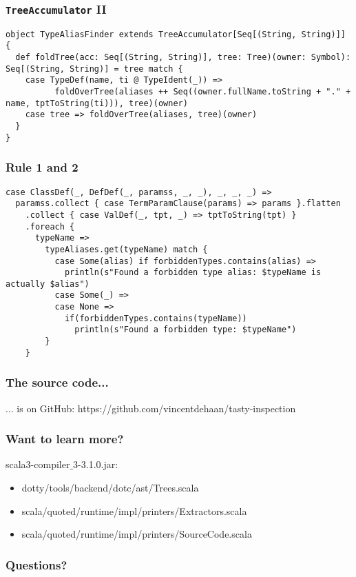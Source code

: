 \documentclass[aspectratio=169]{beamer}
\begin{document}
\begin{frame}[fragile]
\frametitle{\texttt{TreeAccumulator} II}
\begin{lstlisting}[style=myScalastyle,frame=none]
object TypeAliasFinder extends TreeAccumulator[Seq[(String, String)]] {
  def foldTree(acc: Seq[(String, String)], tree: Tree)(owner: Symbol): Seq[(String, String)] = tree match {
    case TypeDef(name, ti @ TypeIdent(_)) =>
          foldOverTree(aliases ++ Seq((owner.fullName.toString + "." + name, tptToString(ti))), tree)(owner)
    case tree => foldOverTree(aliases, tree)(owner)
  }
}
\end{lstlisting}

\end{frame}

\begin{frame}[fragile]
\frametitle{Rule 1 and 2}
\begin{lstlisting}[style=myScalastyle,frame=none]
case ClassDef(_, DefDef(_, paramss, _, _), _, _, _) =>
  paramss.collect { case TermParamClause(params) => params }.flatten
    .collect { case ValDef(_, tpt, _) => tptToString(tpt) }
    .foreach {
      typeName =>
        typeAliases.get(typeName) match {
          case Some(alias) if forbiddenTypes.contains(alias) =>
            println(s"Found a forbidden type alias: $typeName is actually $alias")
          case Some(_) =>
          case None =>
            if(forbiddenTypes.contains(typeName))
              println(s"Found a forbidden type: $typeName")
        }
    }
\end{lstlisting}
\end{frame}

\begin{frame}
\frametitle{The source code...}
  
  ... is on GitHub: https://github.com/vincentdehaan/tasty-inspection
\end{frame}

\begin{frame}
\frametitle{Want to learn more?}
scala3-compiler$\_$3-3.1.0.jar:
\begin{itemize}
 \item dotty/tools/backend/dotc/ast/Trees.scala
 \item scala/quoted/runtime/impl/printers/Extractors.scala
 \item scala/quoted/runtime/impl/printers/SourceCode.scala
\end{itemize}
\end{frame}

\begin{frame}
\frametitle{Questions?}


\end{frame}
\end{document}
